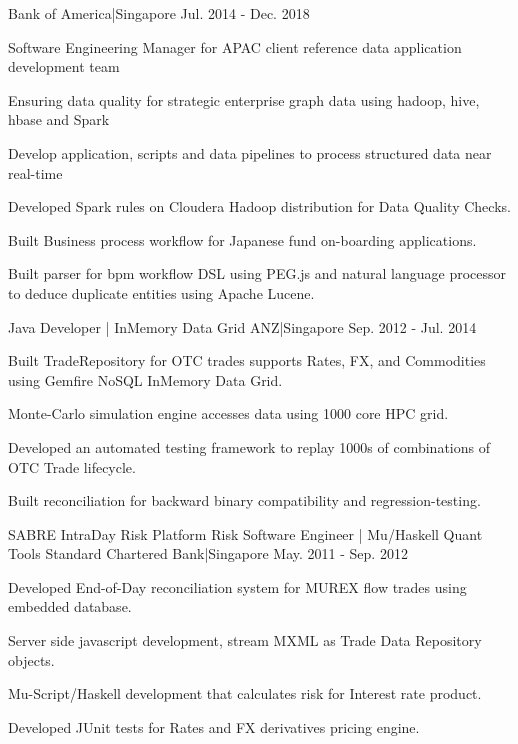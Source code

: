 \begin{cventries}
    {Bank of America|Singapore}
    {Jul. 2014 - Dec. 2018}
    {
      \begin{cvitems}
        \item {Software Engineering Manager for APAC client reference data application development team}
        \item {Ensuring data quality for strategic enterprise graph data using hadoop, hive, hbase and Spark}
        \item {Develop application, scripts and data pipelines to process structured data near real-time}
        \item {Developed Spark rules on Cloudera Hadoop distribution for Data Quality Checks.}
        \item {Built Business process workflow for Japanese fund on-boarding applications.}
        \item {Built parser for bpm workflow DSL using PEG.js and natural language processor to deduce duplicate entities using Apache Lucene.}
      \end{cvitems}
    }
    {Java Developer | InMemory Data Grid}
    {ANZ|Singapore}
    {Sep. 2012 - Jul. 2014}
    {
      \begin{cvitems}
        \item {Built TradeRepository for OTC trades  supports Rates, FX, and Commodities using Gemfire NoSQL InMemory Data Grid.}
        \item {Monte-Carlo simulation engine accesses data using 1000 core HPC grid.}
        \item {Developed an automated testing framework to replay 1000s of combinations of OTC Trade lifecycle.}
        \item {Built reconciliation for backward binary compatibility and regression-testing.}
      \end{cvitems}
    }
  \cventry
    {SABRE IntraDay Risk Platform}
    {Risk Software Engineer | Mu/Haskell Quant Tools}
    {Standard Chartered Bank|Singapore}
    {May. 2011 - Sep. 2012}
    {
      \begin{cvitems}
        \item {Developed End-of-Day reconciliation system for MUREX flow trades using embedded database.}
        \item {Server side javascript development, stream MXML as Trade Data Repository objects.}
        \item {Mu-Script/Haskell development that calculates risk for Interest rate product.}
        \item {Developed JUnit tests for Rates and FX derivatives pricing engine.}

\end{cvitems}}
\end{cventries}

